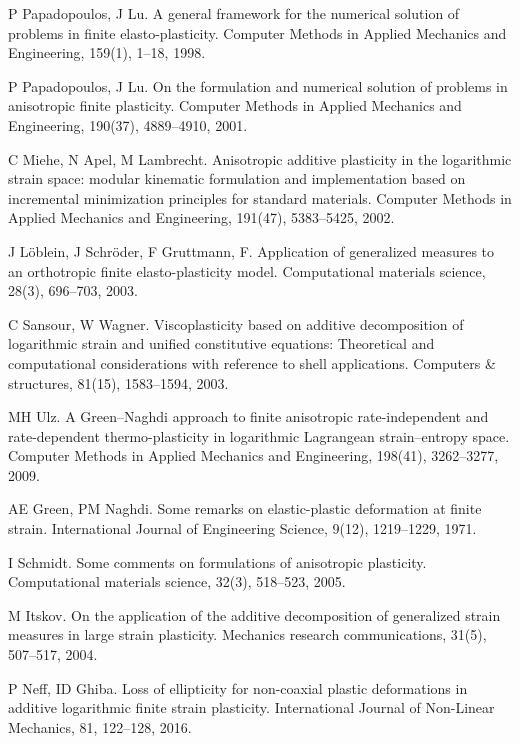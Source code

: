 \documentclass[preprint,review,12pt,sort&compress]{elsarticle}%
\begin{document}
\begin{thebibliography}{99}
P Papadopoulos, J Lu. A general framework for the
numerical solution of problems in finite elasto-plasticity. Computer Methods
in Applied Mechanics and Engineering, 159(1), 1--18, 1998.

P Papadopoulos, J Lu. On the formulation and
numerical solution of problems in anisotropic finite plasticity. Computer
Methods in Applied Mechanics and Engineering, 190(37), 4889--4910, 2001.

C Miehe, N Apel, M Lambrecht. Anisotropic additive
plasticity in the logarithmic strain space: modular kinematic formulation and
implementation based on incremental minimization principles for standard
materials. Computer Methods in Applied Mechanics and Engineering, 191(47),
5383--5425, 2002.

J L\"{o}blein, J Schr\"{o}der, F
Gruttmann, F. Application of generalized measures to an orthotropic finite
elasto-plasticity model. Computational materials science, 28(3), 696--703, 2003.

C Sansour, W Wagner. Viscoplasticity based on
additive decomposition of logarithmic strain and unified constitutive
equations: Theoretical and computational considerations with reference to
shell applications. Computers \& structures, 81(15), 1583--1594, 2003.

MH Ulz. A Green--Naghdi approach to finite anisotropic
rate-independent and rate-dependent thermo-plasticity in logarithmic
Lagrangean strain--entropy space. Computer Methods in Applied Mechanics and
Engineering, 198(41), 3262--3277, 2009.

AE Green, PM Naghdi. Some remarks on elastic-plastic
deformation at finite strain. International Journal of Engineering Science,
9(12), 1219--1229, 1971.

I Schmidt. Some comments on formulations of anisotropic
plasticity. Computational materials science, 32(3), 518--523, 2005.

M Itskov. On the application of the additive decomposition
of generalized strain measures in large strain plasticity. Mechanics research
communications, 31(5), 507--517, 2004.

P Neff, ID Ghiba. Loss of ellipticity for non-coaxial
plastic deformations in additive logarithmic finite strain plasticity.
International Journal of Non-Linear Mechanics, 81, 122--128, 2016.


\end{thebibliography}
\end{document}
